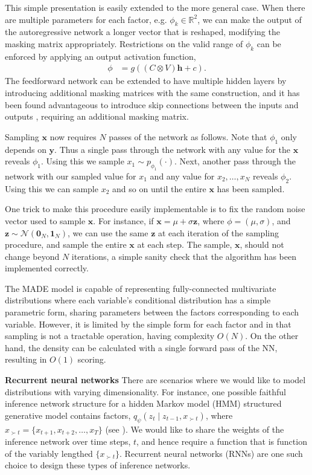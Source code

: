 This simple presentation is easily extended to the more general case. When there are multiple parameters for each factor, e.g. $\phi_k\in\mathbb{R}^2$, we can make the output of the autoregressive network a longer vector that is reshaped, modifying the masking matrix appropriately. Restrictions on the valid range of $\phi_k$ can be enforced by applying an output activation function,
\begin{align*}
	\phi &= g((C\otimes V)\mathbf{h}+c).
\end{align*}
The feedforward network can be extended to have multiple hidden layers by introducing additional masking matrices with the same construction, and it has been found advantageous to introduce skip connections between the inputs and outputs \citep{PaigeWood2016}, requiring an additional masking matrix.

Sampling $\mathbf{x}$ now requires $N$ passes of the network as follows. Note that $\phi_1$ only depends on $\mathbf{y}$. Thus a single pass through the network with any value for the $\mathbf{x}$ reveals $\phi_1$. Using this we sample $x_1\sim p_{\phi_1}(\cdot)$. Next, another pass through the network with our sampled value for $x_1$ and any value for $x_2,\ldots,x_N$ reveals $\phi_2$. Using this we can sample $x_2$ and so on until the entire $\mathbf{x}$ has been sampled.

One trick to make this procedure easily implementable is to fix the random noise vector used to sample $\mathbf{x}$. For instance, if $\mathbf{x}=\mu+\sigma\mathbf{z}$, where $\phi=(\mu,\sigma)$, and $\mathbf{z}\sim\mathcal{N}(\mathbf{0}_N,\mathbf{1}_N)$, we can use the same $\mathbf{z}$ at each iteration of the sampling procedure, and sample the entire $\mathbf{x}$ at each step. The sample, $\mathbf{x}$, should not change beyond $N$ iterations, a simple sanity check that the algorithm has been implemented correctly.

The MADE model is capable of representing fully-connected multivariate distributions where each variable's conditional distribution has a simple parametric form, sharing parameters between the factors corresponding to each variable. However, it is limited by the simple form for each factor and in that sampling is not a tractable operation, having complexity $O(N)$. On the other hand, the density can be calculated with a single forward pass of the NN, resulting in $O(1)$ scoring.

{\bfseries Recurrent neural networks} There are scenarios where we would like to model distributions with varying dimensionality. For instance, one possible faithful inference network structure for a hidden Markov model (HMM) structured generative model contains factors, $q_\psi(z_t\mid z_{t-1},x_{\succ t})$, where $x_{\succ t}=\{x_{t+1},x_{t+2},\ldots,x_T\}$ (see \citet{KrishnanEtAl2017}). We would like to share the weights of the inference network over time steps, $t$, and hence require a function that is function of the variably lengthed $\{x_{\succ t}\}$. Recurrent neural networks (RNNs) \citep{rumelhart1986learning, graves2012supervised} are one such choice to design these types of inference networks.

